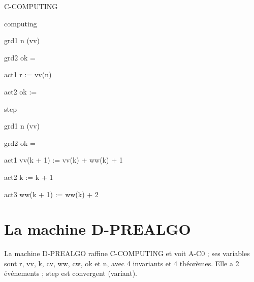 \documentclass[11pt,a4paper]{article}
\begin{document}
\begin{machine}{C-COMPUTING}
\begin{event}{computing}
    \begin{guard}{grd1} n \in \dom(vv) \end{guard}
    \begin{guard}{grd2} ok = \False \end{guard}
    \begin{action}{act1} r := vv(n) \end{action}
    \begin{action}{act2} ok := \True \end{action}
  \end{event}
  \begin{event}[convergent]{step}
    \begin{guard}{grd1} n \notin \dom(vv) \end{guard}
    \begin{guard}{grd2} ok = \False \end{guard}
    \begin{action}{act1} vv(k + 1) := vv(k) + ww(k) + 1 \end{action}
    \begin{action}{act2} k := k + 1 \end{action}
    \begin{action}{act3} ww(k + 1) := ww(k) + 2 \end{action}
  \end{event}
\end{machine}

\section{La machine D-PREALGO}

La machine \textsf{D-PREALGO} raffine \textsf{C-COMPUTING} et voit \textsf{A-C0} ; ses variables sont \textsf{r}, \textsf{vv}, \textsf{k}, \textsf{cv}, \textsf{ww}, \textsf{cw}, \textsf{ok} et \textsf{n}, avec 4 invariants et 4 théorèmes. Elle a 2 événements ; \textsf{step} est convergent (variant).
\end{document}
